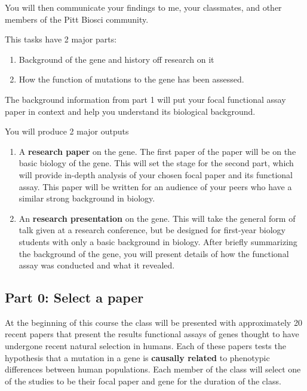 \documentclass[
]{book}
\providecommand{\tightlist}{%
  \setlength{\itemsep}{0pt}\setlength{\parskip}{0pt}}
\begin{document}
You will then communicate your findings to me, your classmates, and other members of the Pitt Biosci community.

This tasks have 2 major parts:

\begin{enumerate}
\def\labelenumi{\arabic{enumi}.}
\tightlist
\item
  Background of the gene and history off research on it
\item
  How the function of mutations to the gene has been assessed.
\end{enumerate}

The background information from part 1 will put your focal functional assay paper in context and help you understand its biological background.

You will produce 2 major outputs

\begin{enumerate}
\def\labelenumi{\arabic{enumi}.}
\tightlist
\item
  A \textbf{research paper} on the gene. The first paper of the paper will be on the basic biology of the gene. This will set the stage for the second part, which will provide in-depth analysis of your chosen focal paper and its functional assay. This paper will be written for an audience of your peers who have a similar strong background in biology.
\item
  An \textbf{research presentation} on the gene. This will take the general form of talk given at a research conference, but be designed for first-year biology students with only a basic background in biology. After briefly summarizing the background of the gene, you will present details of how the functional assay was conducted and what it revealed.
\end{enumerate}

\hypertarget{part-0-select-a-paper}{%
\subsection{Part 0: Select a paper}\label{part-0-select-a-paper}}

At the beginning of this course the class will be presented with approximately 20 recent papers that present the results functional assays of genes thought to have undergone recent natural selection in humans. Each of these papers tests the hypothesis that a mutation in a gene is \textbf{causally related} to phenotypic differences between human populations. Each member of the class will select one of the studies to be their focal paper and gene for the duration of the class.
\end{document}
